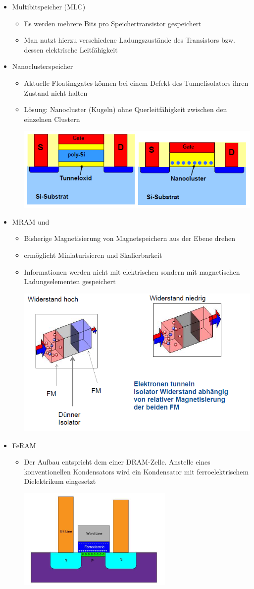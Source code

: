	\begin{itemize}
		\item Multibitspeicher (MLC)
			\begin{itemize}
				\item Es werden mehrere Bits pro Speichertransistor gespeichert
				\item Man nutzt hierzu verschiedene Ladungszustände des Transistors bzw. dessen elektrische Leitfähigkeit
			\end{itemize}
		\item Nanoclusterspeicher
		\begin{itemize}
			\item Aktuelle Floatinggates können bei einem Defekt des Tunnelisolators ihren Zustand nicht halten 
			\item Lösung: Nanocluster (Kugeln) ohne Querleitfähigkeit zwischen den einzelnen Clustern
		
			\includegraphics[width=0.3\linewidth]{Kapitel/Kap07/Nanocluster}
			
		\end{itemize}
		\item MRAM und 
			\begin{itemize}
				\item Bisherige Magnetisierung von Magnetspeichern aus der Ebene drehen
				\item ermöglicht Miniaturisieren und Skalierbarkeit
				\item Informationen werden nicht mit elektrischen sondern mit magnetischen Ladungselementen gespeichert
			
				\includegraphics[width=0.3\linewidth]{Kapitel/Kap07/MRAM.png}
				
			\end{itemize}
		\item FeRAM
			\begin{itemize}
				\item Der Aufbau entspricht dem einer DRAM-Zelle. Anstelle eines konventionellen Kondensators wird ein Kondensator mit ferroelektrischem Dielektrikum eingesetzt
				
				\includegraphics[width=0.2\linewidth]{Kapitel/Kap07/FeRam.png}
				
			\end{itemize}
	\end{itemize}
	

	
	






